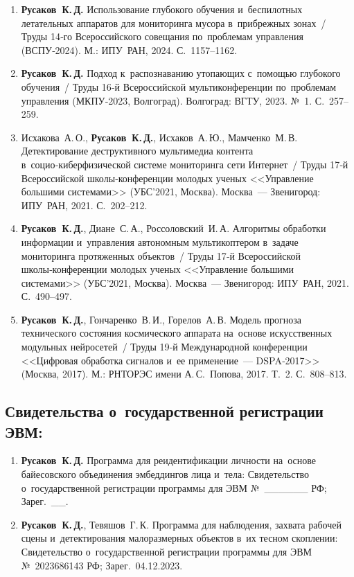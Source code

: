 \begin{enumerate}[resume]
    \item \textbf{Русаков~К.\,Д.} Использование глубокого обучения
          и~беспилотных летательных аппаратов для мониторинга мусора
          в~прибрежных зонах~/ Труды 14‑го Всероссийского совещания
          по~проблемам управления (ВСПУ‑2024). М.: ИПУ~РАН, 2024. С.~1157--1162.
    \item \textbf{Русаков~К.\,Д.} Подход к~распознаванию утопающих с~помощью
          глубокого обучения~/ Труды 16‑й Всероссийской мультиконференции
          по~проблемам управления (МКПУ‑2023, Волгоград). Волгоград: ВГТУ, 2023.
          №~1. С.~257--259.
    \item Исхакова~А.\,О., \textbf{Русаков~К.\,Д.}, Исхаков~А.\,Ю.,
          Мамченко~М.\,В. Детектирование деструктивного мультимедиа контента
          в~социо‑киберфизической системе мониторинга сети Интернет~/ Труды
          17‑й Всероссийской школы‑конференции молодых ученых <<Управление
          большими системами>> (УБС'2021, Москва). Москва~--- Звенигород:
          ИПУ~РАН, 2021. С.~202--212.
    \item \textbf{Русаков~К.\,Д.}, Диане~С.\,А., Россоловский~И.\,А. Алгоритмы
          обработки информации и~управления автономным мультикоптером в~задаче
          мониторинга протяженных объектов~/ Труды 17‑й Всероссийской
          школы‑конференции молодых ученых <<Управление большими системами>>
          (УБС'2021, Москва). Москва~--- Звенигород: ИПУ~РАН, 2021.
          С.~490--497.
    \item \textbf{Русаков~К.\,Д.}, Гончаренко~В.\,И., Горелов~А.\,В. Модель
          прогноза технического состояния космического аппарата на~основе
          искусственных модульных нейросетей~/ Труды 19‑й Международной
          конференции <<Цифровая обработка сигналов и~ее применение~---
          DSPA‑2017>> (Москва, 2017). М.: РНТОРЭС имени А.\,С.~Попова, 2017.
          Т.~2. С.~808--813.
\end{enumerate}

\subsection*{Свидетельства о~государственной регистрации ЭВМ:}

\begin{enumerate}[resume]
    \item \textbf{Русаков~К.\,Д.} Программа для реидентификации личности
          на~основе байесовского объединения эмбеддингов лица и~тела:
          Свидетельство о~государственной регистрации программы для ЭВМ
          №~\_\_\_\_\_\_ РФ; Зарег.~\_\_.
    \item \textbf{Русаков~К.\,Д.}, Тевяшов~Г.\,К. Программа для наблюдения,
          захвата рабочей сцены и~детектирования малоразмерных объектов в~их
          тесном скоплении: Свидетельство о~государственной регистрации программы
          для ЭВМ №~2023686143 РФ; Зарег.~04.12.2023.
\end{enumerate}
